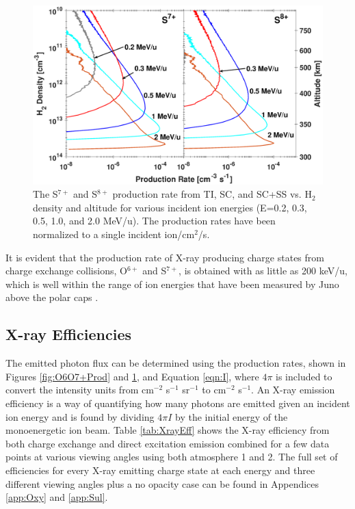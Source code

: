 \documentclass[draft]{agujournal2018}
\begin{document}
\begin{figure}[ht]
    \centering
    \includegraphics[width=\textwidth]{Figures/S7S8CXProd2x2.eps}
    \caption{The S$^{7+}$ and S$^{8+}$ production rate from TI, SC, and SC+SS vs. H$_2$ density and altitude for various incident ion energies (E=0.2, 0.3, 0.5, 1.0, and 2.0 MeV/u). The production rates have been normalized to a single incident ion/cm$^2$/s.}
    \label{fig:S7S8+Prod}
\end{figure}

It is evident that the production rate of X-ray producing charge states from charge exchange collisions, O$^{6+}$ and S$^{7+}$, is obtained with as little as 200 keV/u, which is well within the range of ion energies that have been measured by Juno above the polar caps \citep{haggerty2017,clark2017a,clark2017b}.


\subsection{X-ray Efficiencies}

The emitted photon flux can be determined using the production rates, shown in Figures \ref{fig:O6O7+Prod} and \ref{fig:S7S8+Prod}, and Equation \ref{eqn:I}, where $4\pi$ is included to convert the intensity units from cm$^{-2}$ s$^{-1}$ sr$^{-1}$ to cm$^{-2}$ s$^{-1}$.
An X-ray emission efficiency is a way of quantifying how many photons are emitted given an incident ion energy and is found by dividing $4\pi I$ by the initial energy of the monoenergetic ion beam.
Table \ref{tab:XrayEff} shows the X-ray efficiency from both charge exchange and direct excitation emission combined for a few data points at various viewing angles using both atmosphere 1 and 2.
The full set of efficiencies for every X-ray emitting charge state at each energy and three different viewing angles plus a no opacity case can be found in Appendices \ref{app:Oxy} and \ref{app:Sul}.
\end{document}
